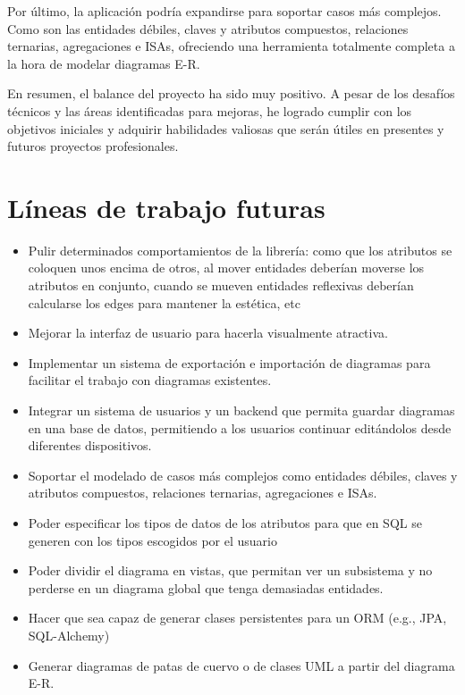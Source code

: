Por último, la aplicación podría expandirse para soportar casos más complejos. Como son las entidades débiles, claves y atributos compuestos, relaciones ternarias, agregaciones e ISAs, ofreciendo una herramienta totalmente completa a la hora de modelar diagramas E-R.

En resumen, el balance del proyecto ha sido muy positivo. A pesar de los desafíos técnicos y las áreas identificadas para mejoras, he logrado cumplir con los objetivos iniciales y adquirir habilidades valiosas que serán útiles en presentes y futuros proyectos profesionales.

\section{Líneas de trabajo futuras}

\begin{itemize}
    \item Pulir determinados comportamientos de la librería: como que los atributos se coloquen unos encima de otros, al mover entidades deberían moverse los atributos en conjunto, cuando se mueven entidades reflexivas deberían calcularse los edges para mantener la estética, etc
    \item Mejorar la interfaz de usuario para hacerla visualmente atractiva.
    \item Implementar un sistema de exportación e importación de diagramas para facilitar el trabajo con diagramas existentes.
    \item Integrar un sistema de usuarios y un backend que permita guardar diagramas en una base de datos, permitiendo a los usuarios continuar editándolos desde diferentes dispositivos.
    \item Soportar el modelado de casos más complejos como entidades débiles, claves y atributos compuestos, relaciones ternarias, agregaciones e ISAs.
    \item Poder especificar los tipos de datos de los atributos para que en SQL se generen con los tipos escogidos por el usuario
    \item Poder dividir el diagrama en vistas, que permitan ver un subsistema y no perderse en un diagrama global que tenga demasiadas entidades.
    \item Hacer que sea capaz de generar clases persistentes para un ORM (e.g., JPA, SQL-Alchemy)
    \item Generar diagramas de patas de cuervo o de clases UML a partir del diagrama E-R.
\end{itemize}
